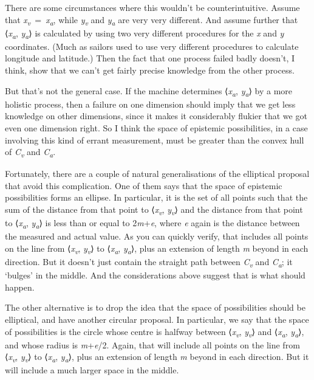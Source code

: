 \documentclass[
  10pt,
  letterpaper,
  DIV=11,
  numbers=noendperiod,
  twoside]{scrartcl}
\begin{document}
There are some circumstances where this wouldn't be counterintuitive.
Assume that \emph{x\textsubscript{v}}~=~\emph{x\textsubscript{a}}, while
\emph{y\textsubscript{v}} and \emph{y\textsubscript{a}} are very very
different. And assume further that ⟨\emph{x\textsubscript{a}},
\emph{y\textsubscript{a}}⟩ is calculated by using two very different
procedures for the \emph{x} and \emph{y} coordinates. (Much as sailors
used to use very different procedures to calculate longitude and
latitude.) Then the fact that one process failed badly doesn't, I think,
show that we can't get fairly precise knowledge from the other process.

But that's not the general case. If the machine determines
⟨\emph{x\textsubscript{a}}, \emph{y\textsubscript{a}}⟩ by a more
holistic process, then a failure on one dimension should imply that we
get less knowledge on other dimensions, since it makes it considerably
flukier that we got even one dimension right. So I think the space of
epistemic possibilities, in a case involving this kind of errant
measurement, must be greater than the convex hull of
\emph{C\textsubscript{v}} and \emph{C\textsubscript{a}}.

Fortunately, there are a couple of natural generalisations of the
elliptical proposal that avoid this complication. One of them says that
the space of epistemic possibilities forms an ellipse. In particular, it
is the set of all points such that the sum of the distance from that
point to ⟨\emph{x\textsubscript{v}}, \emph{y\textsubscript{v}}⟩ and the
distance from that point to ⟨\emph{x\textsubscript{a}},
\emph{y\textsubscript{a}}⟩ is less than or equal to 2\emph{m}+\emph{e},
where \emph{e} again is the distance between the measured and actual
value. As you can quickly verify, that includes all points on the line
from ⟨\emph{x\textsubscript{v}}, \emph{y\textsubscript{v}}⟩ to
⟨\emph{x\textsubscript{a}}, \emph{y\textsubscript{a}}⟩, plus an
extension of length \emph{m} beyond in each direction. But it doesn't
just contain the straight path between \emph{C\textsubscript{v}} and
\emph{C\textsubscript{a}}; it `bulges' in the middle. And the
considerations above suggest that is what should happen.

The other alternative is to drop the idea that the space of
possibilities should be elliptical, and have another circular proposal.
In particular, we say that the space of possibilities is the circle
whose centre is halfway between ⟨\emph{x\textsubscript{v}},
\emph{y\textsubscript{v}}⟩ and ⟨\emph{x\textsubscript{a}},
\emph{y\textsubscript{a}}⟩, and whose radius is \emph{m}+\emph{e}/2.
Again, that will include all points on the line from
⟨\emph{x\textsubscript{v}}, \emph{y\textsubscript{v}}⟩ to
⟨\emph{x\textsubscript{a}}, \emph{y\textsubscript{a}}⟩, plus an
extension of length \emph{m} beyond in each direction. But it will
include a much larger space in the middle.
\end{document}
